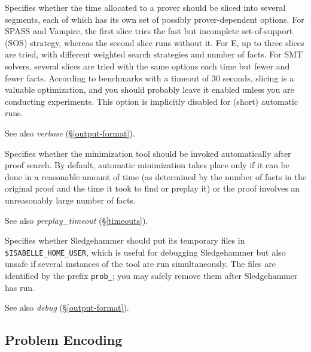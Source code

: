 \documentclass[a4paper,12pt]{article}
\newcommand\const[1]{\textsf{#1}}
\begin{document}
\begin{enum}
Specifies whether the time allocated to a prover should be sliced into several
segments, each of which has its own set of possibly prover-dependent options.
For SPASS and Vampire, the first slice tries the fast but incomplete
set-of-support (SOS) strategy, whereas the second slice runs without it. For E,
up to three slices are tried, with different weighted search strategies and
number of facts. For SMT solvers, several slices are tried with the same options
each time but fewer and fewer facts. According to benchmarks with a timeout of
30 seconds, slicing is a valuable optimization, and you should probably leave it
enabled unless you are conducting experiments. This option is implicitly
disabled for (short) automatic runs.

\nopagebreak
{\small See also \textit{verbose} (\S\ref{output-format}).}

Specifies whether the minimization tool should be invoked automatically after
proof search. By default, automatic minimization takes place only if
it can be done in a reasonable amount of time (as determined by
the number of facts in the original proof and the time it took to find or
preplay it) or the proof involves an unreasonably large number of facts.

\nopagebreak
{\small See also \textit{preplay\_timeout} (\S\ref{timeouts}).}

Specifies whether Sledgehammer should put its temporary files in
\texttt{\$ISA\-BELLE\_\allowbreak HOME\_\allowbreak USER}, which is useful for
debugging Sledgehammer but also unsafe if several instances of the tool are run
simultaneously. The files are identified by the prefix \texttt{prob\_}; you may
safely remove them after Sledgehammer has run.

\nopagebreak
{\small See also \textit{debug} (\S\ref{output-format}).}
\end{enum}

\subsection{Problem Encoding}
\label{problem-encoding}

\newcommand\comb[1]{\const{#1}}
\end{document}
